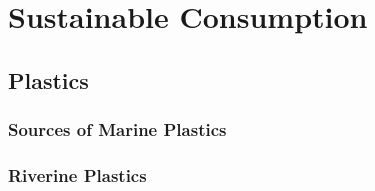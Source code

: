 \chapter{Sustainable Consumption}\label{ch:consumption}

\section{Plastics}

\subsection{Sources of Marine Plastics}



\subsection{Riverine Plastics}

